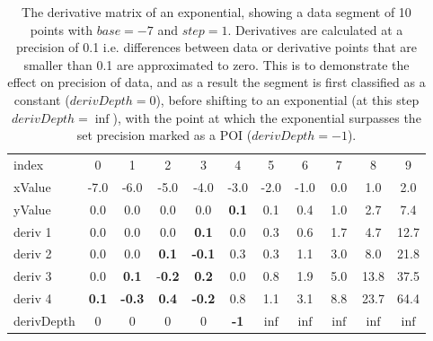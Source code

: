 \documentclass[main.tex]{subfiles}
\begin{document}
  
  \begin{table}[h]
    \caption{The derivative matrix of an exponential, showing a data segment of 10 points with $base=-7$ and $step=1$. Derivatives are calculated at a precision of 0.1 i.e. differences between data or derivative points that are smaller than 0.1 are approximated to zero. This is to demonstrate the effect on precision of data, and as a result the segment is first classified as a constant ($derivDepth=0$), before shifting to an exponential (at this step $derivDepth=\inf$), with the point at which the exponential surpasses the set precision marked as a POI ($derivDepth=-1$).}
    \centering
    \begin{tabularx}{0.85\textwidth}{ X | c c c c c c c c c c }
      index & 0 & 1 & 2 & 3 & 4 & 5 & 6 & 7 & 8 & 9 \\
      xValue & -7.0 & -6.0 & -5.0 & -4.0 & -3.0 & -2.0 & -1.0 & 0.0 & 1.0 & 2.0 \\
      \hline \hline
      yValue & 0.0 & 0.0 & 0.0 & 0.0 & \textbf{0.1} & 0.1 & 0.4 &  1.0 & 2.7 & 7.4 \\
      \hline
      deriv 1 & 0.0 & 0.0 & 0.0 & \textbf{0.1} & 0.0 & 0.3 & 0.6 & 1.7 & 4.7 & 12.7 \\
      deriv 2 & 0.0 & 0.0 & \textbf{0.1} & \textbf{-0.1} & 0.3 & 0.3 & 1.1 & 3.0 & 8.0 & 21.8 \\
      deriv 3 & 0.0 & \textbf{0.1} & -\textbf{0.2} & \textbf{0.2} & 0.0 & 0.8 & 1.9 & 5.0 & 13.8 & 37.5 \\   
      deriv 4 & \textbf{0.1} & \textbf{-0.3} & \textbf{0.4} & \textbf{-0.2} & 0.8 & 1.1 & 3.1 & 8.8 & 23.7 & 64.4 \\  
      \hline
      derivDepth & 0 & 0 & 0 & 0 & \textbf{-1} & $\inf$ & $\inf$ & $\inf$ & $\inf$ & $\inf$ \\   
    \end{tabularx}
    \label{tbl:mtrx:exp}
  \end{table}
\end{document}
